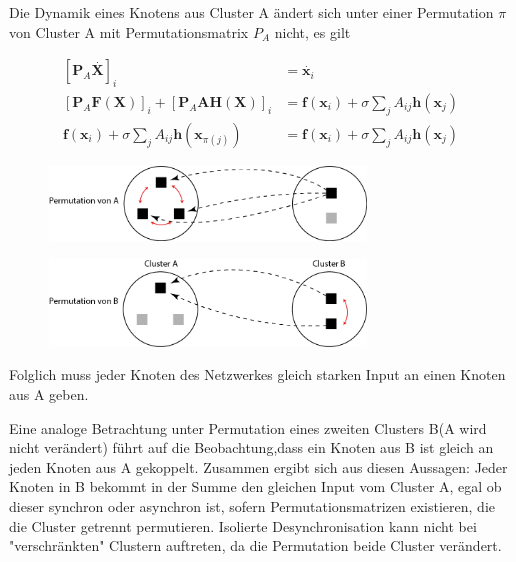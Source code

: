Die Dynamik eines Knotens aus Cluster A ändert sich unter einer Permutation $\pi$ von Cluster A mit Permutationsmatrix $P_A$ nicht, es gilt



\begin{align*}
		\left[\boldsymbol{P}_A	\overset{\cdot}{\boldsymbol{X}}\right]_i&=
		\overset{\cdot}{\boldsymbol{x}}_i\\
		\left[\boldsymbol{P}_A \boldsymbol{F}(\boldsymbol{X})\right]_i+
			\left[\boldsymbol{P}_A\boldsymbol{A}\boldsymbol{H}(\boldsymbol{X})\right]_i&=
					\boldsymbol{f}(\boldsymbol{x}_i)+
						\sigma\sum_j
					A_{ij}\boldsymbol{h}(\boldsymbol{x}_j)\\
		\boldsymbol{f}(\boldsymbol{x}_i)+
			\sigma\sum_j A_{ij}\boldsymbol{h}(\boldsymbol{x}_{\pi\left(j\right)})&=
		\boldsymbol{f}(\boldsymbol{x}_i)+
			\sigma\sum_j
		A_{ij}\boldsymbol{h}(\boldsymbol{x}_j)		
\end{align*}
	\begin{figure}
		\includegraphics[width=0.75\textwidth]{abb/misc/perm_a.png}
	\end{figure}


	\begin{figure}
		\includegraphics[width=0.75\textwidth]{abb/misc/perm_b.png}
	\end{figure}
	
		Folglich muss jeder Knoten des Netzwerkes gleich starken Input an einen Knoten aus A geben.

		Eine analoge Betrachtung  unter Permutation eines zweiten Clusters B(A wird nicht verändert) führt auf die Beobachtung,dass ein Knoten aus B ist gleich an jeden Knoten aus A gekoppelt.
Zusammen ergibt sich aus diesen Aussagen: Jeder Knoten in B bekommt in der Summe den gleichen Input vom Cluster A, egal ob dieser synchron oder asynchron ist, sofern Permutationsmatrizen existieren, die die Cluster getrennt permutieren. Isolierte Desynchronisation kann nicht bei "verschränkten" Clustern auftreten, da die Permutation beide Cluster verändert.


